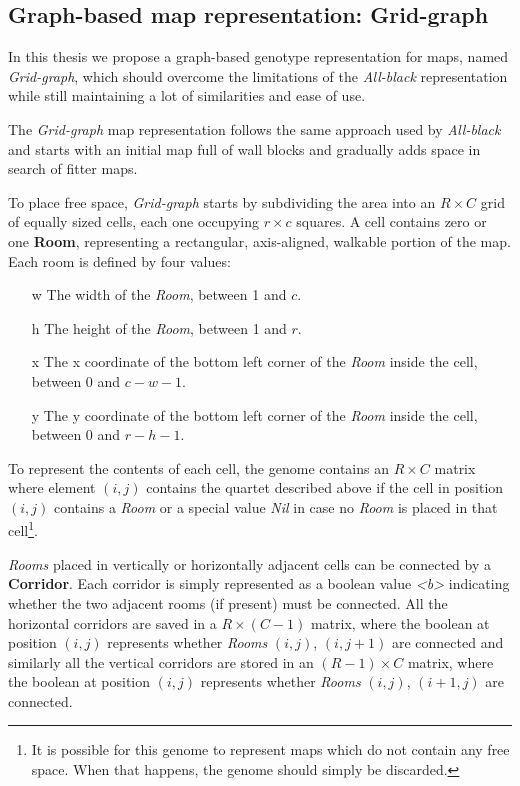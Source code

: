 \subsection{Graph-based map representation: Grid-graph}
In this thesis we propose a graph-based genotype representation for maps, named \textit{Grid-graph}, which should overcome the limitations of the \textit{All-black} representation while still maintaining a lot of similarities and ease of use. 

The \textit{Grid-graph} map representation follows the same approach used by \textit{All-black} and starts with an initial map full of wall blocks and gradually adds space in search of fitter maps.

To place free space, \textit{Grid-graph} starts by subdividing the area into an $R \times C$ grid of equally sized cells, each one occupying $r \times c$ squares. A cell contains zero or one \textbf{Room}, representing a rectangular, axis-aligned, walkable portion of the map. Each room is defined by four values:
\begin{itemize}
\item[w] The width of the \textit{Room}, between 1 and $c$.
\item[h] The height of the \textit{Room}, between 1 and $r$.
\item[x] The x coordinate of the bottom left corner of the \textit{Room} inside the cell, between 0 and $c-w-1$. 
\item[y] The y coordinate of the bottom left corner of the \textit{Room} inside the cell, between 0 and $r-h-1$.
\end{itemize}
To represent the contents of each cell, the genome contains an $R \times C$ matrix where element $(i,j)$ contains the quartet described above if the cell in position $(i,j)$ contains a \textit{Room} or a special value \textit{Nil} in case no \textit{Room} is placed in that cell\footnote{It is possible for this genome to represent maps which do not contain any free space. When that happens, the genome should simply be discarded.}.

\textit{Rooms} placed in vertically or horizontally adjacent cells can be connected by a \textbf{Corridor}. Each corridor is simply represented as a boolean value \textit{<b>} indicating whether the two adjacent rooms (if present) must be connected. All the horizontal corridors are saved in a $R \times (C-1)$ matrix, where the boolean at position $(i,j)$ represents whether \textit{Rooms} $(i,j)$, $(i,j+1)$ are connected and similarly all the vertical corridors are stored in an $(R-1) \times C$ matrix, where the boolean at position $(i,j)$ represents whether \textit{Rooms} $(i,j)$, $(i+1,j)$ are connected.

